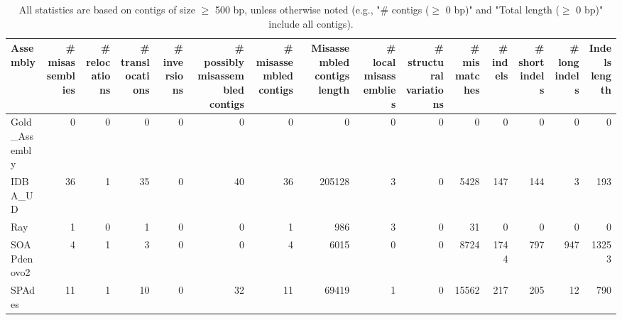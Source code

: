 \documentclass[12pt,a4paper]{article}
\begin{document}
\begin{table}[ht]
\begin{center}
\caption{All statistics are based on contigs of size $\geq$ 500 bp, unless otherwise noted (e.g., "\# contigs ($\geq$ 0 bp)" and "Total length ($\geq$ 0 bp)" include all contigs).}
\begin{tabular}{|l*{14}{|r}|}
\hline
Assembly & \# misassemblies &     \# relocations &     \# translocations &     \# inversions & \# possibly misassembled contigs & \# misassembled contigs & Misassembled contigs length & \# local misassemblies & \# structural variations & \# mismatches & \# indels &     \# short indels &     \# long indels & Indels length \\ \hline
Gold\_Assembly & 0 & 0 & 0 & 0 & 0 & 0 & 0 & 0 & 0 & 0 & 0 & 0 & 0 & 0 \\ \hline
IDBA\_UD & 36 & 1 & 35 & 0 & 40 & 36 & 205128 & 3 & 0 & 5428 & 147 & 144 & 3 & 193 \\ \hline
Ray & 1 & 0 & 1 & 0 & 0 & 1 & 986 & 3 & 0 & 31 & 0 & 0 & 0 & 0 \\ \hline
SOAPdenovo2 & 4 & 1 & 3 & 0 & 0 & 4 & 6015 & 0 & 0 & 8724 & 1744 & 797 & 947 & 13253 \\ \hline
SPAdes & 11 & 1 & 10 & 0 & 32 & 11 & 69419 & 1 & 0 & 15562 & 217 & 205 & 12 & 790 \\ \hline
\end{tabular}
\end{center}
\end{table}
\end{document}
